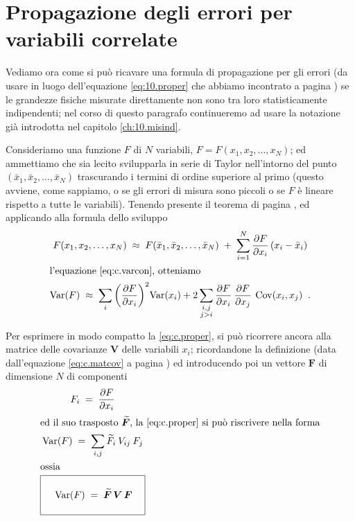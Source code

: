 \section{Propagazione degli errori per variabili
  correlate}%
%
\label{ch:c.proper}
Vediamo ora come si pu\`o ricavare una formula di
propagazione per gli errori (da usare in luogo
dell'equazione \eqref{eq:10.proper} che abbiamo incontrato a
pagina \pageref{eq:10.proper}) se le grandezze fisiche
misurate direttamente non sono tra loro statisticamente
indipendenti; nel corso di questo paragrafo continueremo ad
usare la notazione gi\`a introdotta nel capitolo
\ref{ch:10.misind}.

Consideriamo una funzione $F$ di $N$ variabili, $F = F(x_1,
x_2,\ldots, x_N)$; ed ammettiamo che sia lecito svilupparla
in serie di Taylor nell'intorno del punto $(\bar x_1, \bar
x_2,\ldots, \bar x_N)$ trascurando i termini di ordine
superiore al primo (questo avviene, come sappiamo, o se gli
errori di misura sono piccoli o se $F$ \`e lineare rispetto
a tutte le variabili).  Tenendo presente il teorema di
pagina \pageref{def:5.varind}, ed applicando alla formula
dello sviluppo
\begin{gather}
  F(x_1, x_2,\ldots, x_N) \; \approx \;
  F(\bar x_1, \bar x_2,\ldots, \bar x_N) \; + \;
    \sum_{i=1}^N \frac{\partial F}{\partial x_i}
    \left( x_i - \bar x_i \right) \notag \\
  \intertext{l'equazione \eqref{eq:c.varcon}, otteniamo}
  \var(F) \; \approx \; \sum_i \left( \frac{\partial F}
    {\partial x_i} \right)^2 \! \var(x_i) + 2
    \sum_{\substack{i, j\\ j > i}} \frac{\partial
    F}{\partial x_i} \: \frac{\partial F}{\partial x_j}
    \: \cov(x_i, x_j) \peq . \label{eq:c.proper}
\end{gather}

Per esprimere in modo compatto la \eqref{eq:c.proper}, si
pu\`o ricorrere ancora alla matrice delle covarianze%
$\boldsymbol{V}$ delle variabili $x_i$; ricordandone la
definizione (data dall'equazione \eqref{eq:c.matcov} a
pagina \pageref{eq:c.matcov}) ed introducendo poi un vettore
$\boldsymbol{F}$ di dimensione $N$ di componenti
\begin{gather*}
  F_i \; = \; \frac{\partial F}{\partial x_i} \\
  \intertext{ed il suo trasposto $\boldsymbol{\widetilde
    F}$, la \eqref{eq:c.proper} si pu\`o riscrivere nella
    forma}
  \var(F) \; = \; \sum_{i,j} \widetilde F_i \: V_{ij}
    \: F_j \\
  \intertext{ossia}
  \boxed{ \rule[-5mm]{0mm}{12mm} \quad
    \var(F) \; = \; \boldsymbol{\widetilde F}
      \, \boldsymbol{V} \, \boldsymbol{F}
  \quad}
\end{gather*}%


